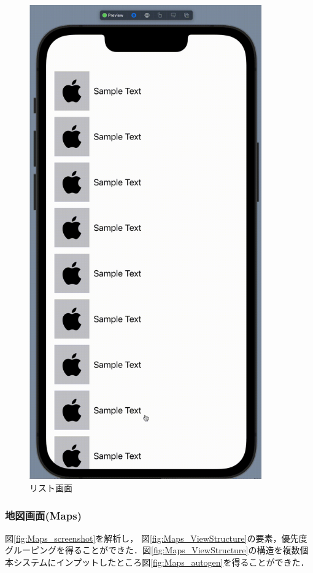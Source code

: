 \begin{figure}[htbp]
  \begin{minipage}{\hsize}
    \begin{center}
       \includegraphics[width=100mm]{img/Settings_autogen.png}
    \end{center}
    \caption{リスト画面}
    \label{fig:Settings_autogen}
  \end{minipage}
\end{figure}


\subsubsection{地図画面(Maps)}
図\ref{fig:Maps_screenshot}を解析し， 図\ref{fig:Maps_ViewStructure}の要素，優先度グルーピングを得ることができた．図\ref{fig:Maps_ViewStructure}の構造を複数個本システムにインプットしたところ図\ref{fig:Maps_autogen}を得ることができた．


